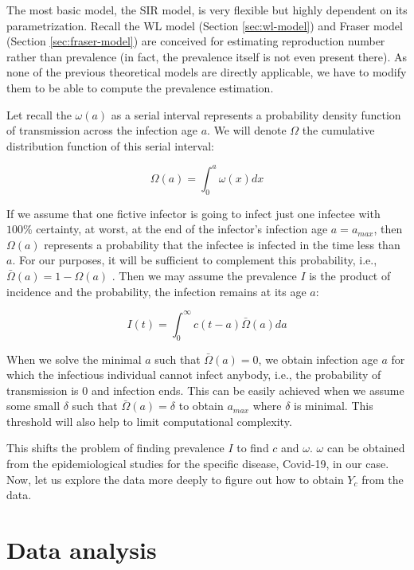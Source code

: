 \documentclass[
  digital, %
  oneside, %
  lof,     %
  lot,     %
]{fithesis4}
\begin{document}
The most basic model, the SIR model, is very flexible but highly dependent on its parametrization.
Recall the WL model (Section \ref{sec:wl-model}) and Fraser model (Section \ref{sec:fraser-model}) are conceived for estimating reproduction number rather than prevalence (in fact, the prevalence itself is not even present there).
As none of the previous theoretical models are directly applicable, we have to modify them to be able to compute the prevalence estimation.

Let recall the $\omega(a)$ as a serial interval represents a probability density function of transmission across the infection age $a$.
We will denote $\Omega$ the cumulative distribution function of this serial interval:

\begin{equation}\label{eq:Omega-int}
  \Omega(a) = \int_{0}^a \omega(x) dx
\end{equation}

If we assume that one fictive infector is going to infect just one infectee with $100\%$ certainty, at worst, at the end of the infector's infection age $a = a_{max}$, then $\Omega(a)$ represents a probability that the infectee is infected in the time less than $a$.
For our purposes, it will be sufficient to complement this probability, i.e., $\bar{\Omega}(a) = 1 - \Omega(a)$ . Then we may assume the prevalence $I$ is the product of incidence and the probability, the infection remains at its age $a$:

\begin{equation}\label{eq:prevalence-int}
  I(t) = \int_0^{\infty} c(t - a) \bar{\Omega}(a) da
\end{equation}

When we solve the minimal $a$ such that $\bar{\Omega}(a) = 0$, we obtain infection age $a$ for which the infectious individual cannot infect anybody, i.e., the probability of transmission is $0$ and infection ends.
This can be easily achieved when we assume some small $\delta$ such that $\bar{\Omega}(a) = \delta$ to obtain $a_{max}$ where $\delta$ is minimal.
This threshold will also help to limit computational complexity.

This shifts the problem of finding prevalence $I$ to find $c$ and $\omega$. $\omega$ can be obtained from the epidemiological studies for the specific disease, Covid-19, in our case.
Now, let us explore the data more deeply to figure out how to obtain $Y_c$ from the data.


\section{Data analysis}
\end{document}
